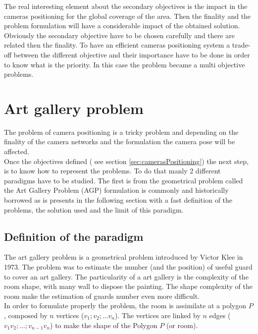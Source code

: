 The real interesting element about the secondary objectives is the impact in the cameras positioning for the global coverage of the area. Then the finality and the problem formulation will have a considerable impact of the obtained solution. Obviously the secondary objective have to be chosen carefully and there are related then the finality. To have an efficient cameras positioning system a trade-off between the different objective  and their importance have to be done in order to know what is the priority. In this case the problem became a multi objective problems. 


\section{Art gallery problem} \label{sec:AGP}

The problem of camera positioning is a tricky problem and depending on the finality of the camera networks and the formulation the camera pose will be affected.\\
 Once the objectives defined ( see section \ref{sec:camerasPositioning}) the next step, is to know how to represent the problems. To do that manly 2 different paradigms have to be studied.
 The first is from the geometrical problem called the Art Gallery Problem (AGP) formulation is commonly and historically borrowed as is presents in the following section with a fast definition of the problems, the solution used and the limit of this paradigm.


	\subsection{Definition of the paradigm}
	The art gallery problem is a geometrical problem introduced by Victor Klee in 1973. The problem was to estimate the number (and the position) of useful guard to cover an art gallery. 
The particularity of a art gallery is the complexity of the room shape, with many wall to dispose the painting. The shape complexity of the room make the estimation  of guards number even more difficult.\\
In order to formulate properly the problem, the room is assimilate at a polygon $P$, composed by $n$ vertices ($v_1; v_2;…v_n$). The vertices are linked by  $n$ edges ($v_1 v_2;…; v_{n-1} v_n$) to make  the shape of the Polygon $P$ (or room).

